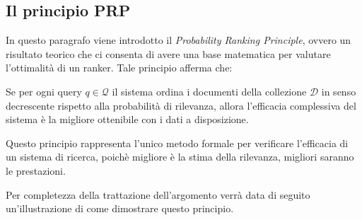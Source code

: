 \subsection{Il principio PRP}

In questo paragrafo viene introdotto il \textit{Probability Ranking Principle}, ovvero un risultato
teorico che ci consenta di avere una base matematica per valutare l'ottimalità di un ranker.
Tale principio afferma che:

\begin{definizione}\label{def:prp}
	Se per ogni query $q \in \mathcal{Q}$ il sistema ordina i documenti della collezione $\mathcal{D}$ in
	senso decrescente rispetto alla probabilità di rilevanza, allora l'efficacia complessiva del sistema
	è la migliore ottenibile con i dati a disposizione.
\end{definizione}

Questo principio rappresenta l'unico metodo formale per verificare l'efficacia di un sistema
di ricerca, poichè migliore è la stima della rilevanza, migliori saranno le prestazioni.

Per completezza della trattazione dell'argomento verrà data di seguito
un'illustrazione di come dimostrare questo principio.

